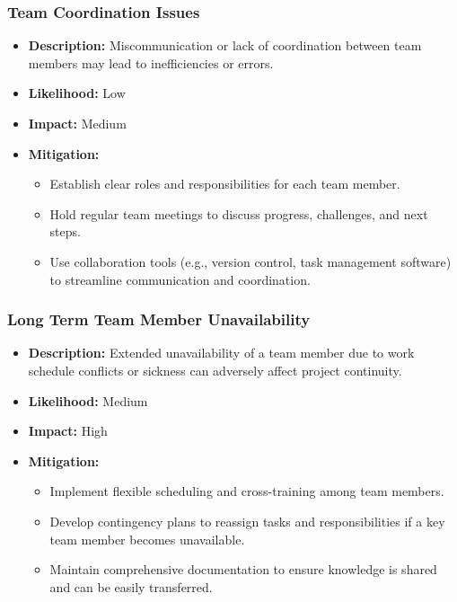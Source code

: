\documentclass{article}
\begin{document}
\subsubsection{Team Coordination Issues}
\begin{itemize}
    \item \textbf{Description:} Miscommunication or lack of coordination between team members may lead to inefficiencies or errors.
    \item \textbf{Likelihood:} Low
    \item \textbf{Impact:} Medium
    \item \textbf{Mitigation:}
        \begin{itemize}
            \item Establish clear roles and responsibilities for each team member.
            \item Hold regular team meetings to discuss progress, challenges, and next steps.
            \item Use collaboration tools (e.g., version control, task management software) to streamline communication and coordination.
        \end{itemize}
\end{itemize}

\subsubsection{Long Term Team Member Unavailability}
\begin{itemize}
    \item \textbf{Description:} Extended unavailability of a team member due to work schedule conflicts or sickness can adversely affect project continuity.
    \item \textbf{Likelihood:} Medium
    \item \textbf{Impact:} High
    \item \textbf{Mitigation:}
        \begin{itemize}
            \item Implement flexible scheduling and cross-training among team members.
            \item Develop contingency plans to reassign tasks and responsibilities if a key team member becomes unavailable.
            \item Maintain comprehensive documentation to ensure knowledge is shared and can be easily transferred.
        \end{itemize}
\end{itemize}
\end{document}
